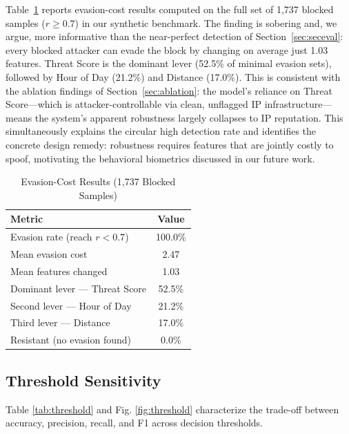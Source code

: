 \documentclass[conference]{IEEEtran}
\begin{document}
Table~\ref{tab:evasion} reports evasion-cost results computed on the full set of 1{,}737 blocked samples ($r \ge 0.7$) in our synthetic benchmark. The finding is sobering and, we argue, more informative than the near-perfect detection of Section~\ref{sec:seceval}: every blocked attacker can evade the block by changing on average just 1.03 features. Threat Score is the dominant lever (52.5\% of minimal evasion sets), followed by Hour of Day (21.2\%) and Distance (17.0\%). This is consistent with the ablation findings of Section~\ref{sec:ablation}: the model's reliance on Threat Score---which is attacker-controllable via clean, unflagged IP infrastructure---means the system's apparent robustness largely collapses to IP reputation. This simultaneously explains the circular high detection rate and identifies the concrete design remedy: robustness requires features that are jointly costly to spoof, motivating the behavioral biometrics discussed in our future work.

\begin{table}[t]
\caption{Evasion-Cost Results (1{,}737 Blocked Samples)}
\label{tab:evasion}
\centering
\begin{tabular}{@{}lc@{}}
\toprule
Metric & Value \\
\midrule
Evasion rate (reach $r < 0.7$) & 100.0\% \\
Mean evasion cost & 2.47 \\
Mean features changed & 1.03 \\
Dominant lever --- Threat Score & 52.5\% \\
Second lever --- Hour of Day & 21.2\% \\
Third lever --- Distance & 17.0\% \\
Resistant (no evasion found) & 0.0\% \\
\bottomrule
\end{tabular}
\end{table}

\subsection{Threshold Sensitivity}
Table \ref{tab:threshold} and Fig. \ref{fig:threshold} characterize the trade-off between accuracy, precision, recall, and F1 across decision thresholds.
\end{document}
